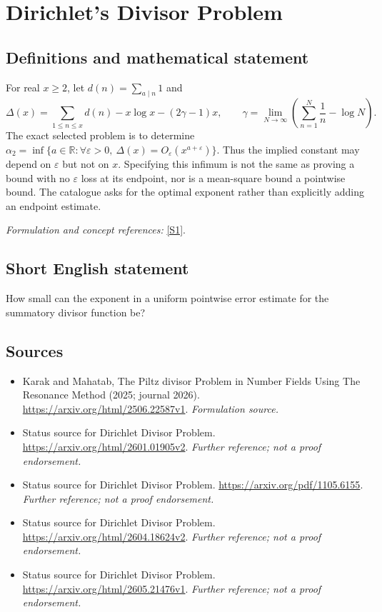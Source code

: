 \documentclass[11pt]{article}
\begin{document}
\section*{\texorpdfstring{Dirichlet's Divisor Problem}{Dirichlet's Divisor Problem}}\label{statement}
\subsection{Definitions and mathematical statement}
For real $x\ge2$, let $d(n)=\sum_{a\mid n}1$ and
\[
 \Delta(x)=\sum_{1\le n\le x}d(n)-x\log x-(2\gamma-1)x,
 \qquad \gamma=\lim_{N\to\infty}\left(\sum_{n=1}^N\frac1n-\log N\right).
\]
The exact selected problem is to determine
$\alpha_2=\inf\{a\in{\mathbb{R}}:\forall{\varepsilon}>0,\ \Delta(x)=O_{\varepsilon}(x^{a+{\varepsilon}})\}$.
Thus the implied constant may depend on ${\varepsilon}$ but not on $x$. Specifying this infimum is not the same as proving a bound with no ${\varepsilon}$ loss at its endpoint, nor is a mean-square bound a pointwise bound. The catalogue asks for the optimal exponent rather than explicitly adding an endpoint estimate.
\par\smallskip\textit{Formulation and concept references:} \href{https://arxiv.org/html/2506.22587v1}{[S1]}.

\subsection{Short English statement}
How small can the exponent in a uniform pointwise error estimate for the summatory divisor function be?
\subsection{Sources}
\begin{itemize}
\item[S1]Karak and Mahatab, The Piltz divisor Problem in Number Fields Using The Resonance Method (2025; journal 2026).
\url{https://arxiv.org/html/2506.22587v1}.
\textit{Formulation source.}
\item[S2]Status source for Dirichlet Divisor Problem.
\url{https://arxiv.org/html/2601.01905v2}.
\textit{Further reference; not a proof endorsement.}
\item[S3]Status source for Dirichlet Divisor Problem.
\url{https://arxiv.org/pdf/1105.6155}.
\textit{Further reference; not a proof endorsement.}
\item[S4]Status source for Dirichlet Divisor Problem.
\url{https://arxiv.org/html/2604.18624v2}.
\textit{Further reference; not a proof endorsement.}
\item[S5]Status source for Dirichlet Divisor Problem.
\url{https://arxiv.org/html/2605.21476v1}.
\textit{Further reference; not a proof endorsement.}
\end{itemize}
\end{document}

